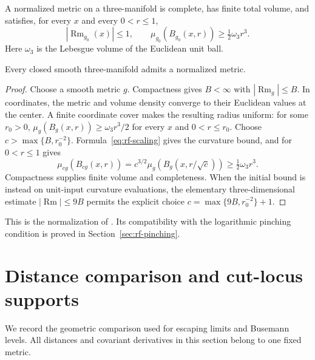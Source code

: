 \begin{definition}\label{def:rf-normalized}
A normalized metric on a three-manifold is complete, has finite total
volume, and satisfies, for every $x$ and every $0<r\leq1$,
\[
 |\operatorname{Rm}_{g_0}(x)|\leq1,\qquad
 \mu_{g_0}(B_{g_0}(x,r))\geq\tfrac12\omega_3r^3.
\]
Here $\omega_3$ is the Lebesgue volume of the Euclidean unit ball.
\end{definition}

\begin{proposition}\label{prop:rf-normalize}
Every closed smooth three-manifold admits a normalized metric.
\end{proposition}
\begin{proof}
Choose a smooth metric $g$.  Compactness gives $B<\infty$ with
$|\operatorname{Rm}_g|\leq B$.  In coordinates, the metric and volume
density converge to their Euclidean values at the center.  A finite
coordinate cover makes the resulting radius uniform: for some $r_0>0$,
$\mu_g(B_g(x,r))\geq\omega_3r^3/2$ for every $x$ and $0<r\leq r_0$.
Choose $c>\max\{B,r_0^{-2}\}$.  Formula~\eqref{eq:rf-scaling} gives the
curvature bound, and for $0<r\leq1$ gives
\[
 \mu_{cg}(B_{cg}(x,r))
 =c^{3/2}\mu_g(B_g(x,r/\sqrt c))\geq\tfrac12\omega_3r^3.
\]
Compactness supplies finite volume and completeness.  When the initial
bound is instead on unit-input curvature evaluations, the elementary
three-dimensional estimate $|\operatorname{Rm}|\leq9B$ permits the
explicit choice $c=\max\{9B,r_0^{-2}\}+1$.
\end{proof}
This is the normalization of \cite[Definition 4.10, p.~67]{MT2007}.
Its compatibility with the logarithmic pinching condition is proved in
Section~\ref{sec:rf-pinching}.

\section{Distance comparison and cut-locus supports}
\label{sec:rf-distance-comparison}

We record the geometric comparison used for escaping limits and
Busemann levels.  All distances and covariant derivatives in this
section belong to one fixed metric.

